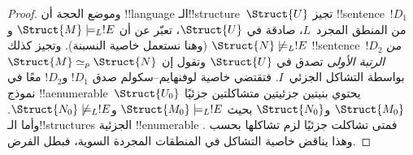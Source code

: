 \documentclass[../../../include/open-logic-section]{subfiles}
\begin{document}
\begin{proof}
وموضع الحجة أن !!{language} الـ!!{structure}~$\Struct{U}$
تجيز !!{sentence}~$!D_1$ من المنطق المجرد~$L$، صادقة في $\Struct{U}$، تعبّر عن أن
$\Struct{M} \models_L !E$ و$\Struct{N} \not\models_L !E$ (وهنا نستعمل
خاصية النسبنة). وتجيز كذلك !!{sentence}~$!D_2$ \emph{من الرتبة الأولى}
تصدق في $\Struct{U}$ وتقول إن $\Struct{M} \simeq_p \Struct{N}$ بواسطة
التشاكل الجزئي~$I$. فتقتضي خاصية لوفنهايم--سكولم صدق $!D_1$ و$!D_2$ معًا
في نموذج !!a{enumerable}~$\Struct{U_0}$ يحتوي بنيتين جزئيتين متشاكلتين
جزئيًا $\Struct{M_0}$ و$\Struct{N_0}$ بحيث
$\Struct{M_0} \models_L !E$ و$\Struct{N_0} \not\models_L !E$. وأما
الـ!!{structure}s الجزئية !!{enumerable} فمتى تشاكلت جزئيًا لزم تشاكلها
بحسب . وهذا يناقض خاصية التشاكل في المنطقات
المجردة السوية، فبطل الفرض.
\end{proof}
\end{document}
